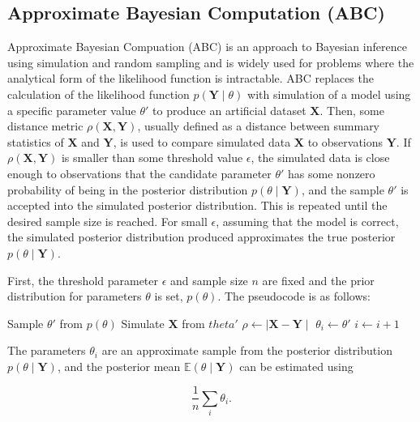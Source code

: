  \subsection{Approximate Bayesian Computation
(ABC)}
 Approximate Bayesian Compuation (ABC) is an approach to Bayesian
inference using
 simulation and random sampling \cite{Beaumont2002,
Sisson2010} and is widely used for problems where the analytical form of the likelihood function is intractable.
 ABC replaces the calculation
 of the likelihood function
$p(\bm{Y}
\mid \theta)$ with simulation of a model using a specific parameter
value
$\theta'$ to produce an artificial dataset
 $\bm{X}$. Then, some
distance metric
$\rho (\bm{X}, \bm{Y}) $, usually defined
 as a distance
between summary
statistics of $\bm{X}$ and $\bm{Y}$, is used to
 compare
simulated data $\bm{X}$
to observations $\bm{Y}$. If $\rho (\bm{X},
 \bm{Y}) $
is smaller than some
threshold value $\epsilon$, the simulated data is
 close
enough to observations
that the candidate parameter $\theta'$ has some
nonzero probability of being in
the posterior distribution $ p(\theta \mid \bm{Y})$, and the sample $\theta'$
is accepted into the simulated posterior
distribution. This is repeated until
the desired sample size is reached. For
small $\epsilon$, assuming that the
model is correct, the simulated posterior
distribution produced approximates
the
 true posterior $ p(\theta \mid
\bm{Y})$.

 First, the threshold parameter
$\epsilon$ and sample size $n$
are fixed and the
 prior distribution for
parameters $\theta$ is
set, $p(\theta)$. The pseudocode is as
follows:
 \begin{algorithmic}
     \State Sample $\theta'$ from $p(\theta)$
     \State Simulate $\bm{X}$ from $theta'$
     \State $\rho \gets \mid \bm{X} - \bm{Y} \mid$
\If {$\rho < \epsilon$}
  \State $\theta_i \gets \theta'$
  \State $i \gets i + 1$
\EndIf
\EndWhile
 \end{algorithmic}
The parameters $\theta_i$ are an approximate sample from the posterior distribution $p(\theta \mid \bm{Y})$, and the posterior mean $\mathbb{E}(\theta \mid \bm{Y})$ can be estimated using

\begin{equation}
\frac{1}{n} \sum_i \theta_i .
\end{equation}
